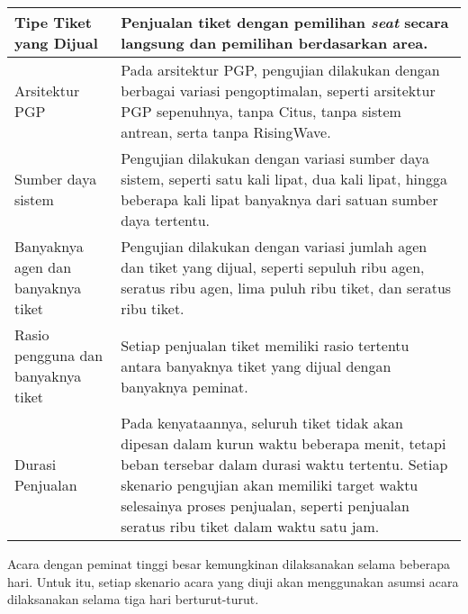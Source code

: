 \begin{longtable}{|p{}|p{}|}
    \hline
    Tipe Tiket yang Dijual             & Penjualan tiket dengan pemilihan \textit{seat} secara langsung dan pemilihan berdasarkan area.                                                                                                                                                                                        \\
    \hline
    \hline
    Arsitektur PGP                     & Pada arsitektur PGP, pengujian dilakukan dengan berbagai variasi pengoptimalan, seperti arsitektur PGP sepenuhnya, tanpa Citus, tanpa sistem antrean, serta tanpa RisingWave.                                                                                                         \\
    \hline
    \hline
    Sumber daya sistem                 & Pengujian dilakukan dengan variasi sumber daya sistem, seperti satu kali lipat, dua kali lipat, hingga beberapa kali lipat banyaknya dari satuan sumber daya tertentu.                                                                                                                \\
    \hline
    \hline
    Banyaknya agen dan banyaknya tiket & Pengujian dilakukan dengan variasi jumlah agen dan tiket yang dijual, seperti sepuluh ribu agen, seratus ribu agen, lima puluh ribu tiket, dan seratus ribu tiket.                                                                                                                    \\
    \hline
    \hline
    Rasio pengguna dan banyaknya tiket & Setiap penjualan tiket memiliki rasio tertentu antara banyaknya tiket yang dijual dengan banyaknya peminat.                                                                                                                                                                           \\
    \hline
    \hline
    Durasi Penjualan                   & Pada kenyataannya, seluruh tiket tidak akan dipesan dalam kurun waktu beberapa menit, tetapi beban tersebar dalam durasi waktu tertentu. Setiap skenario pengujian akan memiliki target waktu selesainya proses penjualan, seperti penjualan seratus ribu tiket dalam waktu satu jam. \\
    \hline
\end{longtable}
\endgroup


Acara dengan peminat tinggi besar kemungkinan dilaksanakan selama beberapa hari. Untuk itu, setiap skenario acara yang diuji akan menggunakan asumsi acara dilaksanakan selama tiga hari berturut-turut.

